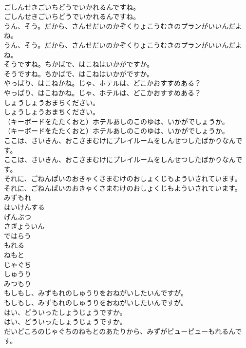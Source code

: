 \documentclass[8pt]{extreport}
\begin{document}
\begin{CJK}{UTF8}{min}
\\	ごしんせきごいちどうでいかれるんですね。
\\	ごしんせきごいちどうでいかれるんですね。
\\	うん、そう。だから、さんせだいのかぞくりょこうむきのプランがいいんだよね。
\\	うん、そう。だから、さんせだいのかぞくりょこうむきのプランがいいんだよね。
\\	そうですね。ちかばで、はこねはいかがですか。
\\	そうですね。ちかばで、はこねはいかがですか。
\\	やっぱり、はこねかね。じゃ、ホテルは、どこかおすすめある？
\\	やっぱり、はこねかね。じゃ、ホテルは、どこかおすすめある？
\\	しょうしょうおまちください。
\\	しょうしょうおまちください。
\\	（キーボードをたたくおと）ホテルあしのこのゆは、いかがでしょうか。
\\	（キーボードをたたくおと）ホテルあしのこのゆは、いかがでしょうか。
\\	ここは、さいきん、おこさまむけにプレイルームをしんせつしたばかりなんです。
\\	ここは、さいきん、おこさまむけにプレイルームをしんせつしたばかりなんです。
\\	それに、ごねんぱいのおきゃくさまむけのおしょくじもよういされています。
\\	それに、ごねんぱいのおきゃくさまむけのおしょくじもよういされています。
\\	みずもれ
\\	はいけんする
\\	げんぶつ
\\	さぎょういん
\\	ではらう
\\	もれる
\\	ねもと
\\	じゃぐち
\\	しゅうり
\\	みつもり
\\	もしもし、みずもれのしゅうりをおねがいしたいんですが。
\\	もしもし、みずもれのしゅうりをおねがいしたいんですが。
\\	はい、どういったしょうじょうですか。
\\	はい、どういったしょうじょうですか。
\\	だいどころのじゃぐちのねもとのあたりから、みずがピューピューもれるんです。

\end{CJK}
\end{document}

